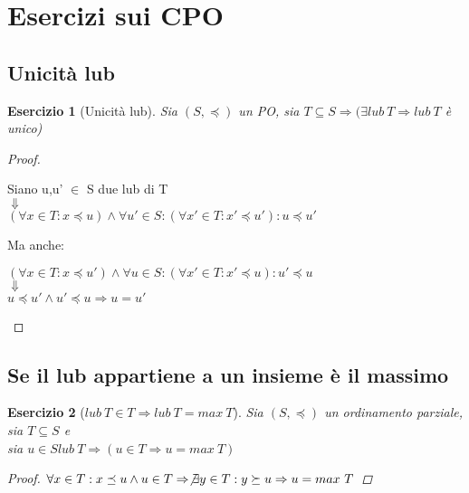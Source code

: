 \section{Esercizi sui CPO}

\theoremstyle{definizione}
\newtheorem{esercizio}{Esercizio}

\subsection{Unicità lub}
\begin{esercizio}[Unicità lub]
  Sia $(S, \preceq)$ un \emph{PO}, sia $T \subseteq S \Rightarrow (\exists lub\ T \Rightarrow lub\ T$ è unico)
\end{esercizio}
\begin{proof}
  \begin{center}
    Siano u,u' $\in$ S due lub di T\\
    $\Downarrow$\\
    $(\forall x \in T : x \preceq u) \land \forall u' \in S :
    (\forall x' \in T : x' \preceq u') : u \preceq u'$
  \end{center}
  Ma anche:
  \begin{center}
    $(\forall x \in T : x \preceq u') \land \forall u \in S :
    (\forall x' \in T : x' \preceq u) : u' \preceq u$\\
    $\Downarrow$\\
    $u \preceq u' \land u' \preceq u \Rightarrow u = u'$
  \end{center}
\end{proof}

\subsection{Se il lub appartiene a un insieme è il massimo}
\begin{esercizio}[$lub\ T \in T \Rightarrow lub\ T = max\ T$]
  Sia $(S, \preceq)$ un ordinamento parziale, sia $T \subseteq S$ e\\
  sia $u \in S lub\ T \Rightarrow (u \in T \Rightarrow u = max\ T)$
  \begin{proof}
    $\forall x \in T : x \preceq u \land u \in T \Rightarrow \not \exists y \in T : y \succeq u \Rightarrow u = max\ T$
  \end{proof}
\end{esercizio}

